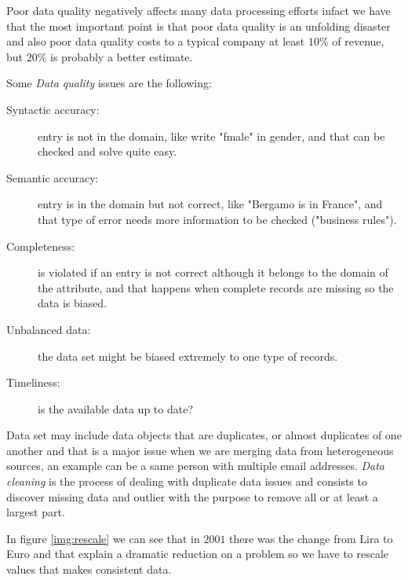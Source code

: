 Poor data quality negatively affects many data processing efforts infact we have that the most important point
is that poor data quality is an unfolding disaster and also poor data quality costs to a typical company
at least $10\%$ of revenue, but $20\%$ is probably a better estimate.

Some \emph{Data quality} issues are the following:
\begin{description}
    \item [Syntactic accuracy: ] entry is not in the domain, like write "fmale" in gender, and that can be 
                                  checked and solve quite easy.
    \item [Semantic accuracy: ] entry is in the domain but not correct, like "Bergamo is in France", and 
                                that type of error needs more information to be checked ("business rules").
    \item [Completeness: ] is violated if an entry is not correct although it belongs to the domain of the attribute,
                           and that happens when complete records are missing so the data is biased.

    \item [Unbalanced data: ] the data set might be biased extremely to one type of records.
    \item [Timeliness: ] is the available data up to date?
\end{description}
Data set may include data objects that are duplicates, or almost duplicates of one another and that is 
a major issue when we are merging data from heterogeneous sources, an example can be a same person with
multiple email addresses.
\emph{Data cleaning} is the process of dealing with duplicate data issues and consists to discover 
missing data and outlier with the purpose to remove all or at least a largest part.

In figure \ref{img:rescale} we can see that in $2001$ there was the change from Lira to Euro and 
that explain a dramatic reduction on a problem so we have to rescale values that makes consistent data.

